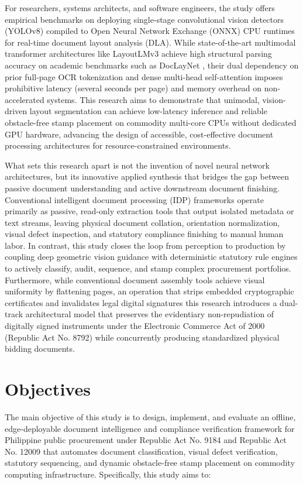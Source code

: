 For researchers, systems architects, and software engineers, the study offers empirical benchmarks on deploying single-stage convolutional vision detectors (YOLOv8) compiled to Open Neural Network Exchange (ONNX) CPU runtimes for real-time document layout analysis (DLA).
While state-of-the-art multimodal transformer architectures like LayoutLMv3 \cite{ref8} achieve high structural parsing accuracy on academic benchmarks such as DocLayNet \cite{ref9}, their dual dependency on prior full-page OCR tokenization and dense multi-head self-attention imposes prohibitive latency (several seconds per page) and memory overhead on non-accelerated systems.
This research aims to demonstrate that unimodal, vision-driven layout segmentation can achieve low-latency inference and reliable obstacle-free stamp placement on commodity multi-core CPUs without dedicated GPU hardware, advancing the design of accessible, cost-effective document processing architectures for resource-constrained environments.

What sets this research apart is not the invention of novel neural network architectures, but its innovative applied synthesis that bridges the gap between passive document understanding and active downstream document finishing.
Conventional intelligent document processing (IDP) frameworks operate primarily as passive, read-only extraction tools that output isolated metadata or text streams, leaving physical document collation, orientation normalization, visual defect inspection, and statutory compliance finishing to manual human labor.
In contrast, this study closes the loop from perception to production by coupling deep geometric vision guidance with deterministic statutory rule engines to actively classify, audit, sequence, and stamp complex procurement portfolios.
Furthermore, while conventional document assembly tools achieve visual uniformity by flattening pages, an operation that strips embedded cryptographic certificates and invalidates legal digital signatures this research introduces a dual-track architectural model that preserves the evidentiary non-repudiation of digitally signed instruments under the Electronic Commerce Act of 2000 (Republic Act No. 8792) \cite{ref10} while concurrently producing standardized physical bidding documents.

\section{Objectives}
\label{sec:objectives}
The main objective of this study is to design, implement, and evaluate an offline, edge-deployable document intelligence and compliance verification framework for Philippine public procurement under Republic Act No. 9184 \cite{ref1} and Republic Act No. 12009 \cite{ref2} that automates document classification, visual defect verification, statutory sequencing, and dynamic obstacle-free stamp placement on commodity computing infrastructure. Specifically, this study aims to:

